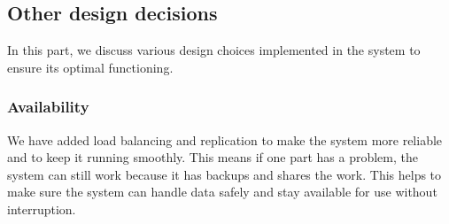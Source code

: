 \subsection{Other design decisions}
In this part, we discuss various design choices implemented in the system to ensure its optimal functioning.
\subsubsection{Availability}
We have added load balancing and replication to make the system more reliable and to keep it running smoothly. This means if one part has a problem, the system can still work because it has backups and shares the work. This helps to make sure the system can handle data safely and stay available for use without interruption.


